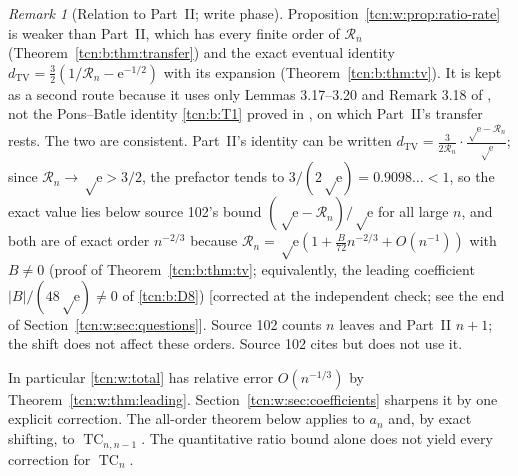 \documentclass[11pt,letterpaper]{article}
\newcommand{\ee}{\mathrm e}
\newcommand{\TC}{\operatorname{TC}}
\theoremstyle{remark}
\newtheorem{remark}[theorem]{Remark}
\begin{document}
\begin{remark}[Relation to Part~II; write phase]\label{tcn:w:rem:tv}
Proposition~\ref{tcn:w:prop:ratio-rate} is weaker than Part~II, which has every finite order of $\mathcal R_n$ (Theorem~\ref{tcn:b:thm:transfer}) and the exact eventual identity $d_{\mathrm{TV}}=\tfrac32(1/\mathcal R_n-\ee^{-1/2})$ with its expansion (Theorem~\ref{tcn:b:thm:tv}). It is kept as a second route because it uses only Lemmas 3.17--3.20 and Remark 3.18 of \cite{Chang2024}, not the Pons--Batle identity \eqref{tcn:b:T1} proved in \cite{LL2026}, on which Part~II's transfer rests. The two are consistent. Part~II's identity can be written $d_{\mathrm{TV}}=\frac3{2\mathcal R_n}\cdot\frac{\sqrt\ee-\mathcal R_n}{\sqrt\ee}$; since $\mathcal R_n\to\sqrt\ee>3/2$, the prefactor tends to $3/(2\sqrt\ee)=0.9098\ldots<1$, so the exact value lies below source 102's bound $(\sqrt\ee-\mathcal R_n)/\sqrt\ee$ for all large $n$, and both are of exact order $n^{-2/3}$ because $\mathcal R_n=\sqrt\ee(1+\tfrac B{72}n^{-2/3}+O(n^{-1}))$ with $B\ne0$ (proof of Theorem~\ref{tcn:b:thm:tv}; equivalently, the leading coefficient $|B|/(48\sqrt\ee)\neq0$ of \eqref{tcn:b:D8}) \textup{[}corrected at the independent check; see the end of Section~\ref{tcn:w:sec:questions}\textup{]}. Source 102 counts $n$ leaves and Part~II $n+1$; the shift does not affect these orders. Source 102 cites \cite{LL2026} but does not use it.
\end{remark}

In particular \eqref{tcn:w:total} has relative error $O(n^{-1/3})$ by Theorem~\ref{tcn:w:thm:leading}. Section~\ref{tcn:w:sec:coefficients} sharpens it by one explicit correction. The all-order theorem below applies to $a_n$ and, by exact shifting, to $\TC_{n,n-1}$. The quantitative ratio bound alone does not yield every correction for $\TC_n$.
\end{document}
